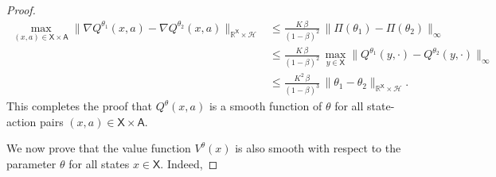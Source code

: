 \documentclass[11pt]{article}
\newcommand{\R}{\mathbb{R}}
\newcommand{\sX}{{\mathsf X}}
\newcommand{\sA}{{\mathsf A}}
\newcommand{\cH}{{\mathcal H}}
\begin{document}
\begin{proof}
\begin{align*}
\max_{(x,a) \in \sX \times \sA} \|\nabla Q^{\theta_1}(x,a) - \nabla Q^{\theta_2}(x,a)\|_{\R^{\sX} \times \cH}  & \leq \frac{K \, \beta}{(1-\beta)^2} \, \|\Pi(\theta_1) - \Pi(\theta_2)\|_{\infty} \\
&\leq \frac{K \, \beta}{(1-\beta)^2} \,\max_{y \in \sX} \|Q^{\theta_1}(y,\cdot) - Q^{\theta_2}(y,\cdot)\|_{\infty} \\
&\leq \frac{K^2 \, \beta}{(1-\beta)^3} \, \| \theta_1 - \theta_2 \|_{\R^{\sX} \times \cH}.
\end{align*}
This completes the proof that $Q^{\theta}(x,a)$ is a smooth function of $\theta$ for all state-action pairs $(x,a) \in \sX \times \sA$.

We now prove that the value function $V^{\theta}(x)$ is also smooth with respect to the parameter $\theta$ for all states $x \in \sX$. Indeed,


\end{proof}
\end{document}
